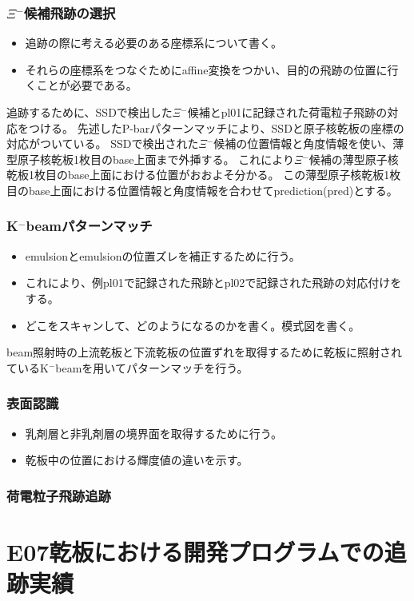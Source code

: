 \documentclass[12pt,a4paper]{jarticle}
\begin{document}
\subsubsection{$\Xi$$^-$候補飛跡の選択}
\begin{itemize}
    \item 追跡の際に考える必要のある座標系について書く。
    \item それらの座標系をつなぐためにaffine変換をつかい、目的の飛跡の位置に行くことが必要である。
\end{itemize}
追跡するために、SSDで検出した$\Xi$$^-$候補とpl01に記録された荷電粒子飛跡の対応をつける。
先述したP-barパターンマッチにより、SSDと原子核乾板の座標の対応がついている。
SSDで検出された$\Xi$$^-$候補の位置情報と角度情報を使い、薄型原子核乾板1枚目のbase上面まで外挿する。
これにより$\Xi$$^-$候補の薄型原子核乾板1枚目のbase上面における位置がおおよそ分かる。
この薄型原子核乾板1枚目のbase上面における位置情報と角度情報を合わせてprediction(pred)とする。
\subsubsection{K$^-$beamパターンマッチ}
\begin{itemize}
    \item emulsionとemulsionの位置ズレを補正するために行う。
    \item これにより、例pl01で記録された飛跡とpl02で記録された飛跡の対応付けをする。
    \item どこをスキャンして、どのようになるのかを書く。模式図を書く。
\end{itemize}
beam照射時の上流乾板と下流乾板の位置ずれを取得するために乾板に照射されているK$^-$beamを用いてパターンマッチを行う。
\subsubsection{表面認識}
\begin{itemize}
    \item 乳剤層と非乳剤層の境界面を取得するために行う。
    \item 乾板中の位置における輝度値の違いを示す。
\end{itemize}
\subsubsection{荷電粒子飛跡追跡}

\newpage
\section{E07乾板における開発プログラムでの追跡実績}
\end{document}
